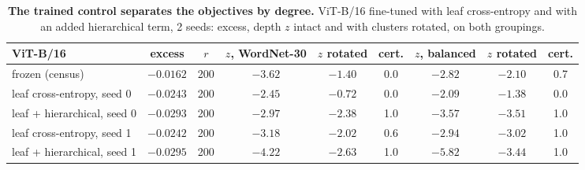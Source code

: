 \begin{table}[H]
\centering
\scriptsize
\setlength{\tabcolsep}{2.2pt}
\begingroup
\footnotesize
\setlength{\tabcolsep}{3pt}
\begin{tabular}{lcccccccc}
\toprule
ViT-B/16 & excess & $r$ & $z$, WordNet-30 & $z$ rotated & cert. & $z$, balanced & $z$ rotated & cert. \\
\midrule
frozen (census) & $-0.0162$ & 200 & $-3.62$ & $-1.40$ & 0.0 & $-2.82$ & $-2.10$ & 0.7 \\
leaf cross-entropy, seed 0 & $-0.0243$ & 200 & $-2.45$ & $-0.72$ & 0.0 & $-2.09$ & $-1.38$ & 0.0 \\
leaf + hierarchical, seed 0 & $-0.0293$ & 200 & $-2.97$ & $-2.38$ & 1.0 & $-3.57$ & $-3.51$ & 1.0 \\
leaf cross-entropy, seed 1 & $-0.0242$ & 200 & $-3.18$ & $-2.02$ & 0.6 & $-2.94$ & $-3.02$ & 1.0 \\
leaf + hierarchical, seed 1 & $-0.0295$ & 200 & $-4.22$ & $-2.63$ & 1.0 & $-5.82$ & $-3.44$ & 1.0 \\
\bottomrule
\end{tabular}
\par\vspace{2pt}
\endgroup
\caption{\textbf{The trained control separates the objectives by degree.} ViT-B/16 fine-tuned with leaf cross-entropy and with an added hierarchical term, 2 seeds: excess, depth $z$ intact and with clusters rotated, on both groupings.
}
\label{tab:q4-depth-d}
\end{table}
